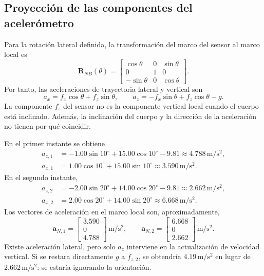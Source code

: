 \subsection{Proyección de las componentes del acelerómetro}
Para la rotación lateral definida, la transformación del marco del sensor al marco local es
\begin{equation}
 \mathbf R_{NB}(\theta)=
 \begin{bmatrix}
 \cos\theta&0&\sin\theta\\
 0&1&0\\
 -\sin\theta&0&\cos\theta
 \end{bmatrix}.
\end{equation}
Por tanto, las aceleraciones de trayectoria lateral y vertical son
\begin{equation}
 a_x=f_x\cos\theta+f_z\sin\theta,\qquad
 a_z=-f_x\sin\theta+f_z\cos\theta-g.
\end{equation}
La componente $f_z$ del sensor no es la componente vertical local cuando el cuerpo está inclinado. Además, la inclinación del cuerpo y la dirección de la aceleración no tienen por qué coincidir.

\newpage
En el primer instante se obtiene
\begin{align}
 a_{z,1}&=-1.00\sin10^\circ+15.00\cos10^\circ-9.81
 \approx4.788\,\mathrm{m/s^2},\\
 a_{x,1}&=1.00\cos10^\circ+15.00\sin10^\circ
 \approx3.590\,\mathrm{m/s^2}.
\end{align}
En el segundo instante,
\begin{align}
 a_{z,2}&=-2.00\sin20^\circ+14.00\cos20^\circ-9.81
 \approx2.662\,\mathrm{m/s^2},\\
 a_{x,2}&=2.00\cos20^\circ+14.00\sin20^\circ
 \approx6.668\,\mathrm{m/s^2}.
\end{align}
Los vectores de aceleración en el marco local son, aproximadamente,
\begin{equation}
 \mathbf a_{N,1}=\begin{bmatrix}3.590\\0\\4.788\end{bmatrix}\,\mathrm{m/s^2},
 \qquad
 \mathbf a_{N,2}=\begin{bmatrix}6.668\\0\\2.662\end{bmatrix}\,\mathrm{m/s^2}.
\end{equation}
Existe aceleración lateral, pero solo $a_z$ interviene en la actualización de velocidad vertical. Si se restara directamente $g$ a $f_{z,2}$, se obtendría $4.19\,\mathrm{m/s^2}$ en lugar de $2.662\,\mathrm{m/s^2}$: se estaría ignorando la orientación.

